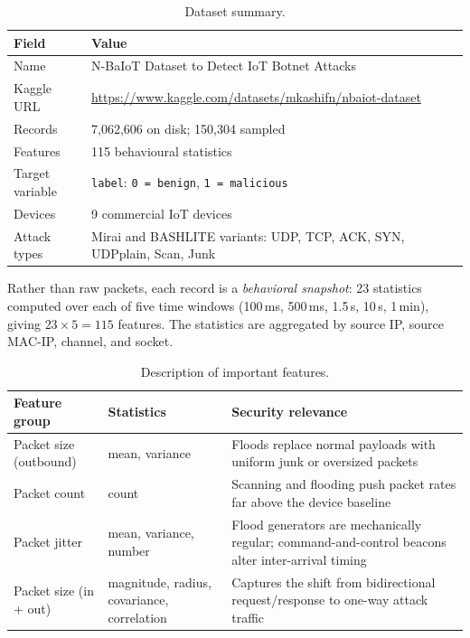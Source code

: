 \documentclass[11pt]{article}
\begin{document}
\begin{table}[h]
\centering
\caption{Dataset summary.}
\label{tab:dataset}
\begin{tabular}{@{} p{} p{} @{}}
\toprule
\textbf{Field} & \textbf{Value} \\
\midrule
Name & N-BaIoT Dataset to Detect IoT Botnet Attacks \\
Kaggle URL & \url{https://www.kaggle.com/datasets/mkashifn/nbaiot-dataset} \\
Records & 7,062,606 on disk; 150,304 sampled \\
Features & 115 behavioural statistics \\
Target variable & \texttt{label}: \texttt{0 = benign}, \texttt{1 = malicious} \\
Devices & 9 commercial IoT devices \\
Attack types & Mirai and BASHLITE variants: UDP, TCP, ACK, SYN, UDPplain, Scan, Junk \\
\bottomrule
\end{tabular}
\end{table}

Rather than raw packets, each record is a \emph{behavioral snapshot}: 23
statistics computed over each of five time windows (100\,ms, 500\,ms, 1.5\,s,
10\,s, 1\,min), giving $23 \times 5 = 115$ features. The statistics are
aggregated by source IP, source MAC-IP, channel, and socket.

\begin{table}[h]
\centering
\caption{Description of important features.}
\label{tab:features}
\begin{tabular}{@{} p{} p{} p{} @{}}
\toprule
\textbf{Feature group} & \textbf{Statistics} & \textbf{Security relevance} \\
\midrule
Packet size (outbound) & mean, variance & Floods replace normal payloads with
uniform junk or oversized packets \\
Packet count & count & Scanning and flooding push packet rates far above the
device baseline \\
Packet jitter & mean, variance, number & Flood generators are mechanically
regular; command-and-control beacons alter inter-arrival timing \\
Packet size (in + out) & magnitude, radius, covariance, correlation &
Captures the shift from bidirectional request/response to one-way attack
traffic \\
\bottomrule
\end{tabular}
\end{table}
\end{document}
